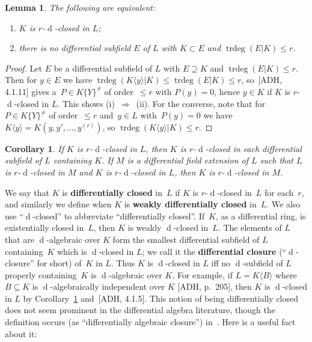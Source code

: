 \documentclass[]{amsart}
\numberwithin{equation}{section}
\def \d{\operatorname{d}}
\newtheorem{lemma}[theorem]{Lemma}
\newtheorem{cor}[theorem]{Corollary}
\theoremstyle{definition}
\theoremstyle{remark}
\renewcommand\leq{\leqslant}
\renewcommand\le{\leq}
\begin{document}
\begin{lemma}
The following are equivalent:
\begin{enumerate}
\item[\textup{(i)}] $K$ is $r$-$\d$-closed in $L$;
\item[\textup{(ii)}] there is no differential subfield $E$ of $L$ with $K\subset E$ and $\operatorname{trdeg}(E|K)\le r$. 
\end{enumerate}
\end{lemma}
\begin{proof}
Let $E$ be a differential subfield of $L$   with $E\supseteq K$ and $\operatorname{trdeg}(E|K)\le r$. Then for $y\in E$ we have $\operatorname{trdeg}(K\langle y\rangle|K)\le \operatorname{trdeg}(E|K)\le r$,
so~[ADH, 4.1.11]  gives a~$P\in K\{Y\}^{\ne}$ of order~$\le r$
with $P(y)=0$, hence $y\in K$ if $K$ is $r$-$\d$-closed in $L$. This shows (i)~$\Rightarrow$~(ii). For the converse, note that for $P\in K\{Y\}^{\neq}$ of order~$\le r$ and~$y\in L$ with~$P(y)=0$ we have
$K\langle y\rangle=K(y,y',\dots,y^{(r)})$, so $\operatorname{trdeg}(K\langle y\rangle|K)\le r$.
\end{proof}

\begin{cor}\label{transdclosed}
If $K$ is $r$-$\d$-closed in $L$, then $K$ is $r$-$\d$-closed in each differential subfield of $L$ containing $K$.
If $M$ is a differential field extension of $L$ such that $L$ is $r$-$\d$-closed in $M$ and $K$ is $r$-$\d$-closed in $L$, then $K$ is $r$-$\d$-closed in $M$.
\end{cor}

\noindent
We say that $K$ is {\bf differentially closed}  in~$L$ if $K$ is 
$r$-$\d$-closed in~$L$ for each~$r$, and similarly we define when  $K$ is {\bf weakly differentially closed}  in~$L$.
We also use ``$\d$-closed'' to abbreviate ``differentially closed''.
If~$K$, as a differential ring, is existentially closed in~$L$, then $K$ is weakly
$\d$-closed in~$L$.
The elements of $L$ that are $\d$-algebraic over $K$ form
the smallest differential subfield of $L$ containing~$K$ which is  $\d$-closed in $L$; we call it the
{\bf differential closure} (``$\d$-closure'' for short) of~$K$ in $L$.  Thus $K$ is $\d$-closed in $L$ iff   no   $\d$-subfield of $L$
properly containing~$K$ is
 $\d$-algebraic over $K$. For example, if
    $L=K\langle B\rangle$ where~$B\subseteq K$ is $\d$-algebraically independent over $K$ [ADH, p.~205], then $K$ is $\d$-closed in $L$ by Corollary~\ref{transdclosed} and~[ADH, 4.1.5].
This notion of being differentially closed does not seem prominent in the differential algebra literature, though the definition occurs (as ``differentially algebraic closure'') in~\cite[p.~102]{Kolchin-DA}. Here is a useful fact about it: 
\end{document}
